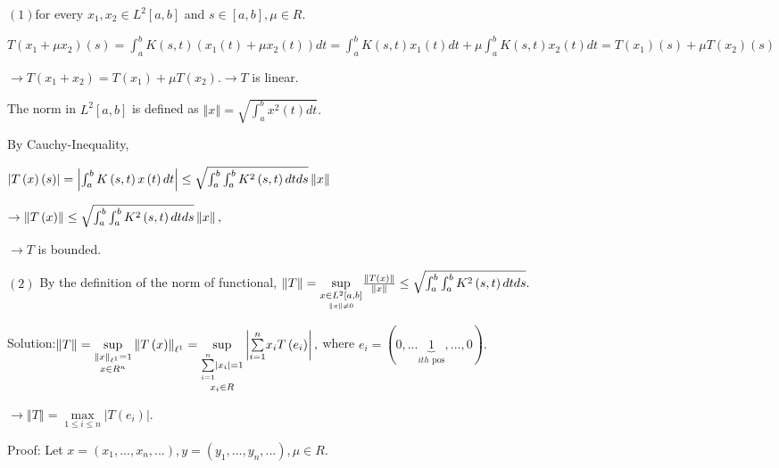 \documentclass{article}
\begin{document}

$\left( 1\right) $for every $x_{1},x_{2}\in L^{2}\left[ a,b\right] $ and $%
s\in \left[ a,b\right] ,\mu \in R.$

$T\left( x_{1}+\mu x_{2}\right) \left( s\right) =\int_{a}^{b}K\left(
s,t\right) \left( x_{1}\left( t\right) +\mu x_{2}\left( t\right) \right)
dt=\int_{a}^{b}K\left( s,t\right) x_{1}\left( t\right) dt+\mu
\int_{a}^{b}K\left( s,t\right) x_{2}\left( t\right) dt=T\left( x_{1}\right)
\left( s\right) +\mu T\left( x_{2}\right) \left( s\right) $

$\rightarrow T\left( x_{1}+x_{2}\right) =T\left( x_{1}\right) +\mu T\left(
x_{2}\right) .\rightarrow T$ is linear.

The norm in $L^{2}\left[ a,b\right] $ is defined as $\left\Vert x\right\Vert
=\sqrt{\int_{a}^{b}x^{2}\left( t\right) dt}.$

By Cauchy-Inequality,

$\left\vert T\left( x\right) \left( s\right) \right\vert =\left\vert
\int_{a}^{b}K\left( s,t\right) x\left( t\right) dt\right\vert \leq \sqrt{%
\int_{a}^{b}\int_{a}^{b}K^{2}\left( s,t\right) dtds}\left\Vert x\right\Vert $

$\rightarrow \left\Vert T\left( x\right) \right\Vert \leq \sqrt{%
\int_{a}^{b}\int_{a}^{b}K^{2}\left( s,t\right) dtds}\left\Vert x\right\Vert ,
$

$\rightarrow T$ is bounded.

$\left( 2\right) $ By the definition of the norm of functional, $\left\Vert
T\right\Vert =\underset{\underset{\left\Vert x\right\Vert \neq 0}{x\in L^{2}%
\left[ a,b\right] }}{\sup }\frac{\left\Vert T\left( x\right) \right\Vert }{%
\left\Vert x\right\Vert }\leq \sqrt{\int_{a}^{b}\int_{a}^{b}K^{2}\left(
s,t\right) dtds}.$


Solution:$\left\Vert T\right\Vert =\underset{x\in R^{n}}{\underset{%
\left\Vert x\right\Vert _{\ell ^{1}}=1}{\sup }}\left\Vert T\left( x\right)
\right\Vert _{\ell ^{1}}=\underset{x_{i}\in R}{\underset{\underset{i=1}{%
\overset{n}{\sum }}\left\vert x_{i}\right\vert =1}{\sup }}\left\vert 
\underset{i=1}{\overset{n}{\sum }}x_{i}T\left( e_{i}\right) \right\vert ,$%
where $e_{i}=\left( 0,...\underset{ith\text{ pos}}{\underbrace{1}}%
,...,0\right) .$

$\rightarrow \left\Vert T\right\Vert =\underset{1\leq i\leq n}{\max }%
\left\vert T\left( e_{i}\right) \right\vert .$


Proof: Let $x=\left( x_{1},...,x_{n},...\right) ,y=\left(
y_{1},...,y_{n},...\right) ,\mu \in R.\qquad $
\end{document}
